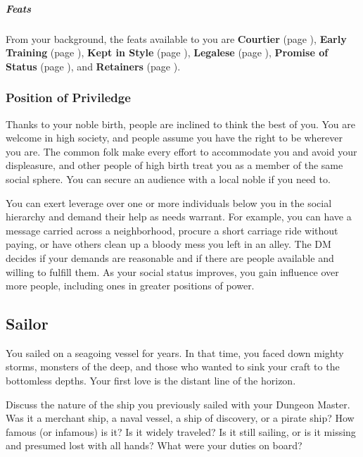     \subparagraph{Feats} From your background, the feats available to you are
    \textbf{Courtier} (page \pageref{feat::courtier}),
    \textbf{Early Training} (page \pageref{feat::earlytraining}),
    \textbf{Kept in Style} (page \pageref{feat::keptinstyle}),
    \textbf{Legalese} (page \pageref{feat::legalese}),
    \textbf{Promise of Status} (page \pageref{feat::promiseofstatus}), and
    \textbf{Retainers} (page \pageref{feat::retainers}).

    \subsubsection{Position of Priviledge}
        Thanks to your noble birth, people are inclined to think the best of you.
        You are welcome in high society, and people assume you have the right to be wherever you are.
        The common folk make every effort to accommodate you and avoid your displeasure, and other people of high birth treat you as a member of the same social sphere.
        You can secure an audience with a local noble if you need to.

        You can exert leverage over one or more individuals below you in the social hierarchy and demand their help as needs warrant.
        For example, you can have a message carried across a neighborhood, procure a short carriage ride without paying, or have others clean up a bloody mess you left in an alley.
        The DM decides if your demands are reasonable and if there are people available and willing to fulfill them.
        As your social status improves, you gain influence over more people, including ones in greater positions of power.

\subsection*{Sailor} \label{ssec::sailor}
    You sailed on a seagoing vessel for years.
    In that time, you faced down mighty storms, monsters of the deep, and those who wanted to sink your craft to the bottomless depths.
    Your first love is the distant line of the horizon.

    Discuss the nature of the ship you previously sailed with your Dungeon Master.
    Was it a merchant ship, a naval vessel, a ship of discovery, or a pirate ship?
    How famous (or infamous) is it?
    Is it widely traveled?
    Is it still sailing, or is it missing and presumed lost with all hands?
    What were your duties on board?


